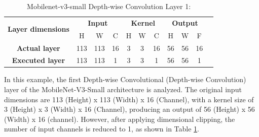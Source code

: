 \begin{table}[H]
\centering
\caption{Mobilenet-v3-small Depth-wise Convolution Layer 1:}
\label{tab:permDConvolutionCase1Dim}
 \begin{tabular}{|c|c|c|c|c|c|c|c|c|c|c|} \hline  
 
 \multirow{2}{*}{\textbf{Layer dimensions}} &  
 \multicolumn{3}{|c|}{\textbf{Input}} &  
 \multicolumn{3}{|c|}{\textbf{Kernel}} &  
 \multicolumn{3}{|c|}{\textbf{Output}}\\ \cline{2-10}
 & H &  W &  C&  H &  W &  C &  H &  W & F\\ \hline  
 \textbf{Actual layer} &  113 &  113 & 16 & 3 & 3 & 16 & 56 & 56 & 16\\ \hline 
 \textbf{Executed layer} &  113 &  113 &  \cellcolor{yellow}1 & 3 & 3 & \cellcolor{yellow}1 & 56 & 56 & \cellcolor{yellow}1 \\ \hline 
 \end{tabular}
\end{table}

In this example, the first Depth-wise Convolutional (Depth-wise Convolution) layer of the MobileNet-V3-Small architecture is analyzed. The original input dimensions are 113 (Height) x 113 (Width) x 16 (Channel), with a kernel size of 3 (Height) x 3 (Width) x 16 (Channel), producing an output of 56 (Height) x 56 (Width) x 16 (channel). However, after applying dimensional clipping, the number of input channels is reduced to 1, as shown in Table \ref{tab:permDConvolutionCase1Dim}.

\begin{table}[H]
\centering
\caption{Output-first permutation}
\label{tab:permDConvolutionCase1Op}
\end{table}

